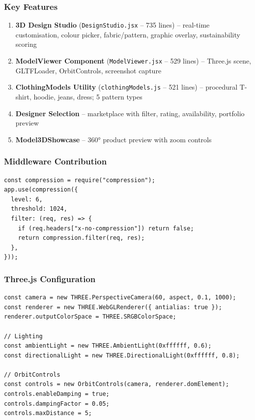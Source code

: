 \documentclass[a4paper,11pt]{article}
\begin{document}
\subsubsection{Key Features}
\begin{enumerate}[noitemsep]
  \item \textbf{3D Design Studio} (\texttt{DesignStudio.jsx} -- 735 lines) -- real-time customisation,
        colour picker, fabric/pattern, graphic overlay, sustainability scoring
  \item \textbf{ModelViewer Component} (\texttt{ModelViewer.jsx} -- 529 lines) -- Three.js scene,
        GLTFLoader, OrbitControls, screenshot capture
  \item \textbf{ClothingModels Utility} (\texttt{clothingModels.js} -- 521 lines) -- procedural T-shirt,
        hoodie, jeans, dress; 5 pattern types
  \item \textbf{Designer Selection} -- marketplace with filter, rating, availability, portfolio preview
  \item \textbf{Model3DShowcase} -- 360° product preview with zoom controls
\end{enumerate}

\subsubsection{Middleware Contribution}
\begin{lstlisting}[caption={Gzip Compression for 3D Models (Kumar)}]
const compression = require("compression");
app.use(compression({
  level: 6,
  threshold: 1024,
  filter: (req, res) => {
    if (req.headers["x-no-compression"]) return false;
    return compression.filter(req, res);
  },
}));
\end{lstlisting}

\subsubsection{Three.js Configuration}
\begin{lstlisting}[caption={3D Graphics Setup (Kumar)}]
const camera = new THREE.PerspectiveCamera(60, aspect, 0.1, 1000);
const renderer = new THREE.WebGLRenderer({ antialias: true });
renderer.outputColorSpace = THREE.SRGBColorSpace;

// Lighting
const ambientLight = new THREE.AmbientLight(0xffffff, 0.6);
const directionalLight = new THREE.DirectionalLight(0xffffff, 0.8);

// OrbitControls
const controls = new OrbitControls(camera, renderer.domElement);
controls.enableDamping = true;
controls.dampingFactor = 0.05;
controls.maxDistance = 5;
\end{lstlisting}
\end{document}
